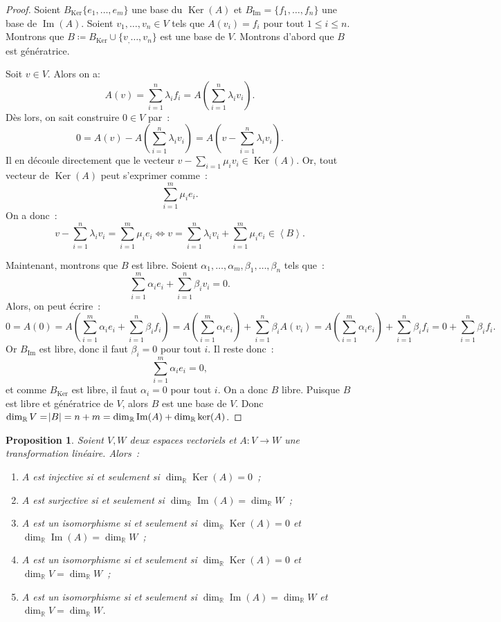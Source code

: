 \documentclass{article}
\DeclareMathOperator{\Ker}{Ker}
\DeclareMathOperator{\Imf}{Im}
\newcommand{\R}{\mathbb R}
\newcommand{\eng}[1]{\left\langle#1\right\rangle}
\newtheorem{prp}[thm]{Proposition}
\theoremstyle{definition}
\theoremstyle{remark}
\begin{document}
		\begin{proof} Soient $B_{\Ker}\{e_1, \dotsc, e_m\}$ une base du $\Ker(A)$ et $B_{\Imf} = \{f_1, \dotsc, f_n\}$ une base de $\Imf(A)$. Soient
		$v_1, \dotsc, v_n \in V$ tels que $A(v_i) = f_i$ pour tout $1 \leq i \leq n$. Montrons que $B \coloneqq B_{\Ker} \cup \{v_, \dotsc, v_n\}$ est une base de $V$.
		Montrons d'abord que $B$ est génératrice.

		Soit $v \in V$. Alors on a: \[A(v) = \sum_{i=1}^n\lambda_if_i = A\left(\sum_{i=1}^n\lambda_iv_i\right).\] Dès lors, on sait construire $0 \in V$ par~:
		\[0 = A(v) - A\left(\sum_{i=1}^n\lambda_iv_i\right) = A\left(v-\sum_{i=1}^n\lambda_iv_i\right).\] Il en découle directement que le vecteur
		$v - \sum_{i=1}\mu_iv_i \in \Ker(A)$. Or, tout vecteur de $\Ker(A)$ peut s'exprimer comme~: \[\sum_{i=1}^m\mu_ie_i.\] On a donc~:
		\[v-\sum_{i=1}^n\lambda_iv_i = \sum_{i=1}^m\mu_ie_i \iff v = \sum_{i=1}^n\lambda_iv_i + \sum_{i=1}^m\mu_ie_i \in \eng B.\]

		Maintenant, montrons que $B$ est libre. Soient $\alpha_1, \dotsc, \alpha_m, \beta_1, \dotsc, \beta_n$ tels que~:
		\[\sum_{i=1}^m\alpha_ie_i + \sum_{i=1}^n\beta_iv_i = 0.\] Alors, on peut écrire~:
		\[0 = A(0) = A\left(\sum_{i=1}^m\alpha_ie_i + \sum_{i=1}^n\beta_if_i\right) = A\left(\sum_{i=1}^m\alpha_ie_i\right) + \sum_{i=1}^n\beta_iA(v_i)
		= A\left(\sum_{i=1}^m\alpha_ie_i\right) + \sum_{i=1}^n\beta_if_i = 0 + \sum_{i=1}^n\beta_if_i.\] Or $B_{\Imf}$ est libre, donc il faut $\beta_i = 0$ pour tout
		$i$. Il reste donc~: \[\sum_{i=1}^m\alpha_ie_i = 0,\] et comme $B_{\Ker}$ est libre, il faut $\alpha_i = 0$ pour tout $i$. On a donc $B$ libre. Puisque $B$ est
		libre et génératrice de $V$, alors $B$ est une base de $V$. Donc $\dim_\R V = \abs B = n+m = \dim_\R\Imf(A) + \dim_\R\ker(A)$. \end{proof}

		\begin{prp}\label{condIsom} Soient $V, W$ deux espaces vectoriels et $A : V \to W$ une transformation linéaire. Alors~:
		\begin{enumerate}
			\item $A$ est injective si et seulement si $\dim_\R \Ker(A) = 0$~;
			\item $A$ est surjective si et seulement si $\dim_\R \Imf(A) = \dim_\R W$~;
			\item $A$ est un isomorphisme si et seulement si $\dim_\R\Ker(A) = 0$ et $\dim_\R\Imf(A) = \dim_\R W$~;
			\item $A$ est un isomorphisme si et seulement si $\dim_\R\Ker(A) = 0$ et $\dim_\R V = \dim_\R W$~;
			\item $A$ est un isomorphisme si et seulement si $\dim_\R \Imf(A) = \dim_\R W$ et $\dim_\R V = \dim_\R W$.
		\end{enumerate}
		\end{prp}
		
\end{document}
